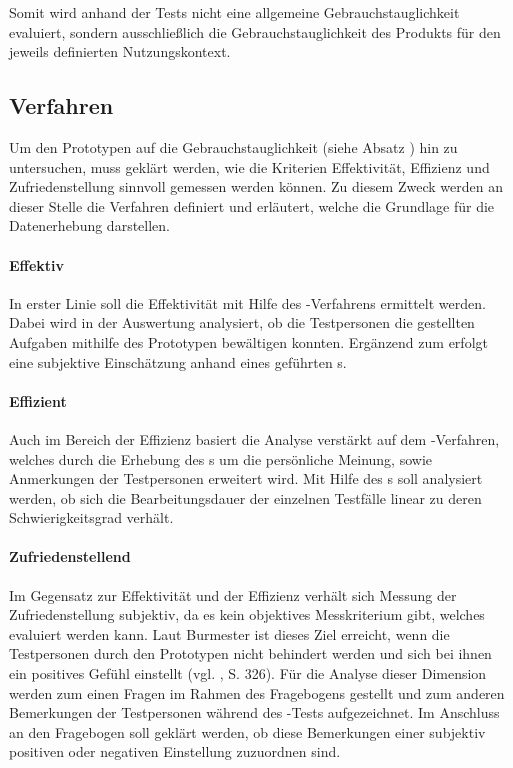 \documentclass[Bachelorarbeit.tex]{subfiles}
\begin{document}
Somit wird anhand der Tests nicht eine allgemeine Gebrauchstauglichkeit evaluiert, sondern ausschließlich die Gebrauchstauglichkeit des Produkts für den jeweils definierten Nutzungskontext.

\subsection{Verfahren}
\label{Verfahren}
Um den Prototypen auf die Gebrauchstauglichkeit (siehe Absatz ) hin zu untersuchen, muss geklärt werden, wie die Kriterien Effektivität, Effizienz und Zufriedenstellung sinnvoll gemessen werden können. 
Zu diesem Zweck werden an dieser Stelle die Verfahren definiert und erläutert, welche die Grundlage für die Datenerhebung darstellen.

\paragraph{Effektiv}
In erster Linie soll die Effektivität mit Hilfe des -Verfahrens ermittelt werden.
Dabei wird in der Auswertung analysiert, ob die Testpersonen die gestellten Aufgaben mithilfe des Prototypen bewältigen konnten.
Ergänzend zum  erfolgt eine subjektive Einschätzung anhand eines geführten s. 

\paragraph{Effizient}
Auch im Bereich der Effizienz basiert die Analyse verstärkt auf dem -Verfahren, welches durch die Erhebung des s um die persönliche Meinung, sowie Anmerkungen der Testpersonen erweitert wird.
Mit Hilfe des s soll analysiert werden, ob sich die Bearbeitungsdauer der einzelnen Testfälle linear zu deren Schwierigkeitsgrad verhält. 

\paragraph{Zufriedenstellend}
Im Gegensatz zur Effektivität und der Effizienz verhält sich Messung der Zufriedenstellung subjektiv, da es kein objektives Messkriterium gibt, welches evaluiert werden kann.
Laut Burmester ist dieses Ziel erreicht, wenn die Testpersonen durch den Prototypen nicht behindert werden und sich bei ihnen ein positives Gefühl einstellt (vgl. \cite{Burmester}, S. 326). 
Für die Analyse dieser Dimension werden zum einen Fragen im Rahmen des Fragebogens gestellt und zum anderen Bemerkungen der Testpersonen während des -Tests aufgezeichnet.
Im Anschluss an den Fragebogen soll geklärt werden, ob diese Bemerkungen einer subjektiv positiven oder negativen Einstellung zuzuordnen sind.
\end{document}
